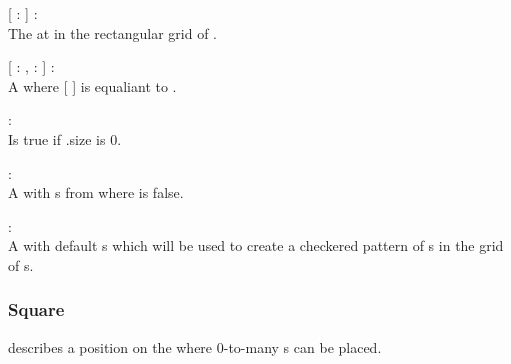 \begin{dlist}
  \item {}[  :  ] : \\
  The  at  in the rectangular grid of .
  
  \item {}[  : ,  :  ] : \\
  A  where [  ] is equaliant to .
  
  \item {} : \\
  Is true if .size is 0.
  
  \item {} : \\
  A  with s from  where  is false.
  
  \item {} : \\
  A  with default s which will be used to create a checkered pattern of s in the grid of s.
\end{dlist}

\subsubsection{Square}
 describes a position on the  where 0-to-many s can be placed.

